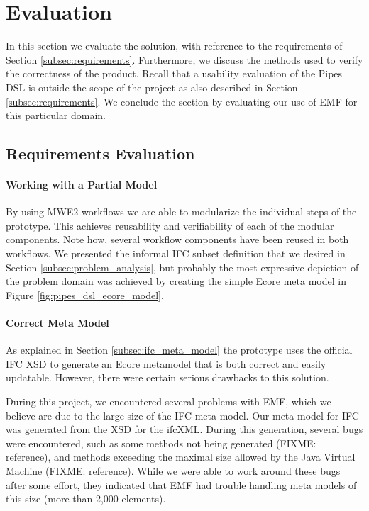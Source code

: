 \section{Evaluation}
\label{sec:evaluation}
In this section we evaluate the solution, with reference to the requirements of Section \ref{subsec:requirements}. Furthermore, we discuss the methods used to verify the correctness of the product. Recall that a usability evaluation of the Pipes DSL is outside the scope of the project as also described in Section \ref{subsec:requirements}. We conclude the section by evaluating our use of EMF for this particular domain.


\subsection{Requirements Evaluation}
\label{subsec:requirements_evaluation}
\paragraph{Working with a Partial Model} By using MWE2 workflows we are able to modularize the individual steps of the prototype. This achieves reusability and verifiability of each of the modular components. Note how, several workflow components have been reused in both workflows. We presented the informal IFC subset definition that we desired in Section \ref{subsec:problem_analysis}, but probably the most expressive depiction of the problem domain was achieved by creating the simple Ecore meta model in Figure \ref{fig:pipes_dsl_ecore_model}.

\paragraph{Correct Meta Model} As explained in Section \ref{subsec:ifc_meta_model} the prototype uses the official IFC XSD to generate an Ecore metamodel that is both correct and easily updatable. However, there were certain serious drawbacks to this solution.

During this project, we encountered several problems with EMF, which we believe are due to the large size of the IFC meta model. Our meta model for IFC was generated from the XSD for the ifcXML. During this generation, several bugs were encountered, such as some methods not being generated (FIXME: reference), and methods exceeding the maximal size allowed by the Java Virtual Machine (FIXME: reference). While we were able to work around these bugs after some effort, they indicated that EMF had trouble handling meta models of this size (more than 2,000 elements).

